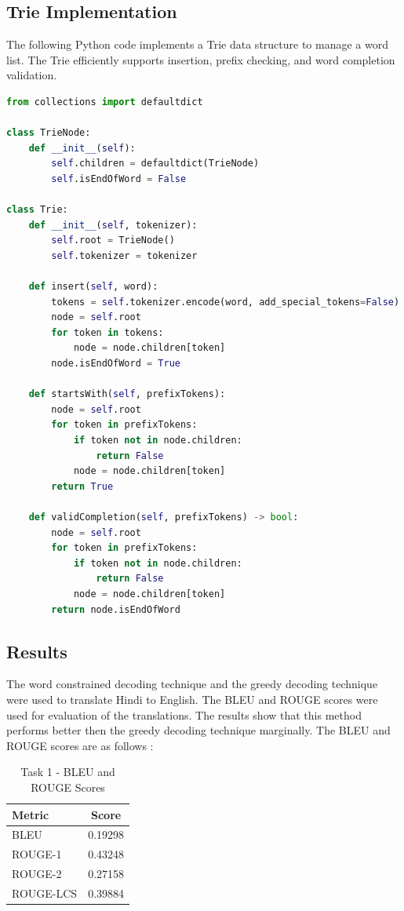 \documentclass[12pt]{article}
\begin{document}
\subsection{Trie Implementation}

The following Python code implements a Trie data structure to manage a word list. The Trie efficiently supports insertion, prefix checking, and word completion validation.

\begin{lstlisting}[language=Python, caption=Trie Implementation]
from collections import defaultdict

class TrieNode:
    def __init__(self):
        self.children = defaultdict(TrieNode)
        self.isEndOfWord = False
    
class Trie:
    def __init__(self, tokenizer):
        self.root = TrieNode()
        self.tokenizer = tokenizer
    
    def insert(self, word):
        tokens = self.tokenizer.encode(word, add_special_tokens=False)
        node = self.root
        for token in tokens:
            node = node.children[token]
        node.isEndOfWord = True
    
    def startsWith(self, prefixTokens):
        node = self.root
        for token in prefixTokens:
            if token not in node.children:
                return False
            node = node.children[token]
        return True

    def validCompletion(self, prefixTokens) -> bool:
        node = self.root
        for token in prefixTokens:
            if token not in node.children:
                return False
            node = node.children[token]
        return node.isEndOfWord
\end{lstlisting}

\subsection{Results}

\noindent The word constrained decoding technique and the greedy decoding technique were used to translate Hindi to English. The BLEU and ROUGE scores were used for evaluation of the translations. The results show that this method performs better then the greedy decoding technique marginally. The BLEU and ROUGE scores are as follows :

\begin{table}[htbp]
    \centering
    \begin{tabular}{|l|c|}
        \hline
        \textbf{Metric} & \textbf{Score} \\
        \hline
        BLEU & 0.19298 \\
        ROUGE-1 & 0.43248 \\
        ROUGE-2 & 0.27158 \\
        ROUGE-LCS & 0.39884 \\
        \hline
    \end{tabular}
    \caption{Task 1 - BLEU and ROUGE Scores}
    \label{tab:task1_scores}
\end{table}
\end{document}
